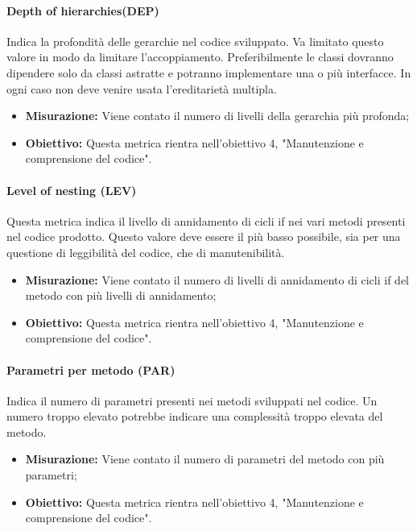 	
	
	
	\paragraph{Depth of hierarchies(DEP)}
	Indica la profondità delle gerarchie nel codice sviluppato. Va limitato questo valore in modo da limitare l'accoppiamento. Preferibilmente le classi dovranno dipendere solo da classi astratte e potranno implementare una o più interfacce. In ogni caso non deve venire usata l'ereditarietà multipla.
	\begin{itemize}
		\item \textbf{Misurazione:} Viene contato il numero di livelli della gerarchia più profonda;
		\item \textbf{Obiettivo:} Questa metrica rientra nell'obiettivo 4, "Manutenzione e comprensione del codice".
	\end{itemize}
	
	\paragraph{Level of nesting (LEV)}
	Questa metrica indica il livello di annidamento di cicli if nei vari metodi presenti nel codice prodotto. Questo valore deve essere il più basso possibile, sia per una questione di leggibilità del codice, che di manutenibilità.
	\begin{itemize}
		\item \textbf{Misurazione:} Viene contato il numero di livelli di annidamento di cicli if del metodo con più livelli di annidamento;
		\item \textbf{Obiettivo:} Questa metrica rientra nell'obiettivo 4, "Manutenzione e comprensione del codice".
	\end{itemize}
	
	
	\paragraph{Parametri per metodo (PAR)}
	Indica il numero di parametri presenti nei metodi sviluppati nel codice. Un numero troppo elevato potrebbe indicare una complessità troppo elevata del metodo.
	\begin{itemize}
		\item \textbf{Misurazione:} Viene contato il numero di parametri del metodo con più parametri;
		\item \textbf{Obiettivo:} Questa metrica rientra nell'obiettivo 4, "Manutenzione e comprensione del codice".
	\end{itemize}
	
